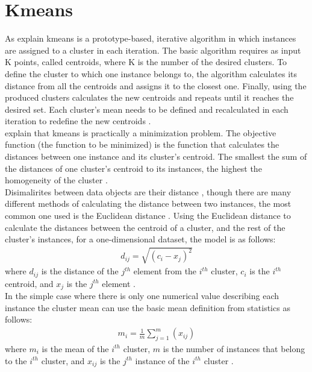 \section{Kmeans}
As \textcite{dunham, tanSteinKum} explain kmeans is a prototype-based, iterative algorithm in which instances are assigned to a cluster in each iteration. The basic algorithm requires as input K points, called centroids, where K is the number of the desired clusters. To define the cluster to which one instance belongs to, the algorithm calculates its distance from all the centroids and assigns it to the closest one. Finally, using the produced clusters calculates the new centroids and repeats until it reaches the desired set. Each cluster's mean needs to be defined and recalculated in each iteration to redefine the new centroids \autocite{dunham, tanSteinKum}. \\
\textcite{euclidean} explain that kmeans is practically a minimization problem. The objective function (the function to be minimized) is the function that calculates the distances between one instance and its cluster's centroid. The smallest the sum of the distances of one cluster's centroid to its instances, the highest the homogeneity of the cluster \autocite[2]{euclidean}. \\
Disimalirites between data objects are their distance \autocite[69]{tanSteinKum}, though there are many different methods of calculating the distance between two instances, the most common one used is the Euclidean distance \autocite[648]{survey}. Using the Euclidean distance to calculate the distances between the centroid of a cluster, and the rest of the cluster's instances, for a one-dimensional dataset, the model is as follows:
\begin{eqnarray*}
d_{ij} = \sqrt{(c_{i}-x_{j})^2}
\end{eqnarray*}
where \(d_{ij}\) is the distance of the \(j^{th}\) element from the \(i^{th}\) cluster, \(c_{i}\) is the \(i^{th}\) centroid, and \(x_{j}\) is the \(j^{th}\) element \autocite[69]{tanSteinKum}. \\
In the simple case where there is only one numerical value describing each instance the cluster mean can use the basic mean definition from statistics as follows: \\
\begin{eqnarray*}
m_{i} = \frac{1}{m}\sum_{j=1}^{m}(x_{ij})
\end{eqnarray*}
where \(m_{i}\) is the mean of the \(i^{th}\) cluster, \(m\) is the number of instances that belong to the \(i^{th}\) cluster, and \(x_{ij}\) is the \(j^{th}\) instance of the \(i^{th}\) cluster \autocite[140]{dunham}. \\
